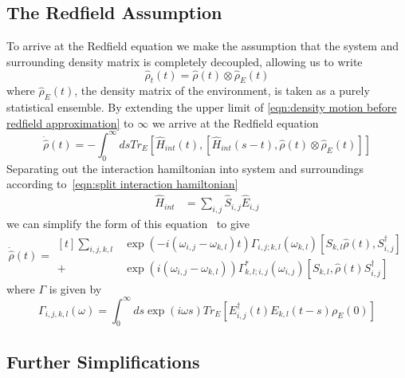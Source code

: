 \subsection{The Redfield Assumption}\label{sec:the redfield assumption}
To arrive at the Redfield equation
we make the assumption that the
system and surrounding density
matrix is completely decoupled,
allowing us to write
\begin{equation}
  \hat{\rho}_t(t) = \hat{\rho}(t) \otimes \hat{\rho}_E(t)
\end{equation}
where \(\hat{\rho}_E(t)\), the
density matrix of the environment,
is taken as a purely statistical ensemble.
By extending the upper limit
of \cref{eqn:density motion before redfield approximation}
to \(\infty \) we arrive at the Redfield
equation
\begin{equation}
  \dot{\hat{\rho}}(t) =
  - \int_0^{\infty} ds
  Tr_{E}[\hat{H}_{int}(t),
      [\hat{H}_{int}(s-t),
          \hat{\rho}(t) \otimes \hat{\rho}_E(t)]]
\end{equation}
Separating out the interaction hamiltonian
into system and surroundings according
to~\cref{eqn:split interaction hamiltonian}
\begin{align}
  \hat{H}_{int} & = \sum_{i,j} \hat{S}_{i,j} \hat{E}_{i,j}
\end{align}
we can simplify the form of this equation~\cite{Manzano_2020} to give
\begin{equation}
  \dot{\hat{\rho{}}}(t) = \begin{aligned}[t]
    \sum_{i,j,k, l} &
    \exp{(-i(\omega_{i,j}-\omega_{k,l})t)}
    \Gamma_{i,j;k, l}(\omega_{k,l})
    [S_{k, l}\hat{\rho}(t),
    S^\dagger_{i,j}]  \\
    +               &
    \exp{(i(\omega_{i,j}-\omega_{k,l}))}
    \Gamma^*_{k, l; i,j}(\omega_{i,j})
    [S_{k, l},
      \hat{\rho}(t) S^\dagger_{i,j}]
  \end{aligned}
\end{equation}
where \(\Gamma \) is given by
\begin{equation}
  \Gamma_{i,j, k,l}(\omega) =
  \int_0^\infty{}{
  ds \exp{(i\omega{}s)}
  Tr_{E}[E^\dagger_{i,j}(t)E_{k,l}(t-s)\rho_E(0)]
  }\label{eqn:gamma definition}
\end{equation}

\subsection{Further Simplifications}


